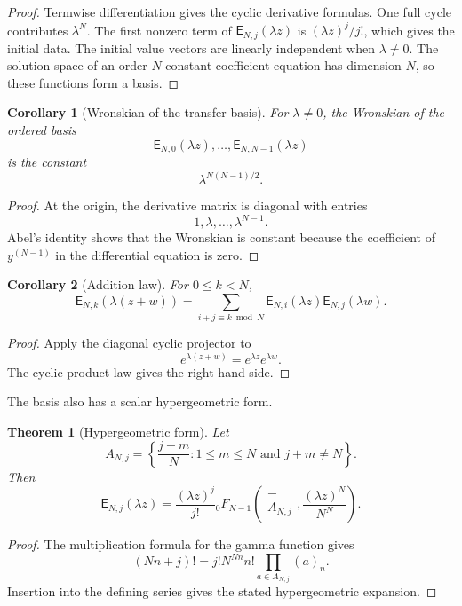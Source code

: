 \documentclass{aomart}
\newtheorem{theorem}{Theorem}[section]
\newtheorem{corollary}[corollary]{Corollary}
\theoremstyle{definition}
\theoremstyle{remark}
\newcommand{\Efun}{\mathsf E}
\begin{document}
\begin{proof}
Termwise differentiation gives the cyclic derivative formulas.  One full cycle contributes $\lambda^N$.  The first nonzero term of $\Efun_{N,j}(\lambda z)$ is $(\lambda z)^j/j!$, which gives the initial data.  The initial value vectors are linearly independent when $\lambda\ne0$.  The solution space of an order $N$ constant coefficient equation has dimension $N$, so these functions form a basis.
\end{proof}


\begin{corollary}[Wronskian of the transfer basis]\label{cor:wronskians}
For $\lambda\ne0$, the Wronskian of the ordered basis
\[
\Efun_{N,0}(\lambda z),\ldots,\Efun_{N,N-1}(\lambda z)
\]
is the constant
\[
\lambda^{N(N-1)/2}.
\]
\end{corollary}

\begin{proof}
At the origin, the derivative matrix is diagonal with entries
\[
1,\lambda,\ldots,\lambda^{N-1}.
\]
Abel's identity shows that the Wronskian is constant because the coefficient of $y^{(N-1)}$ in the differential equation is zero.
\end{proof}

\begin{corollary}[Addition law]\label{cor:exponential_addition}
For $0\leq k<N$,
\[
\Efun_{N,k}(\lambda(z+w))
=
\sum_{i+j\equiv k\bmod N}
\Efun_{N,i}(\lambda z)\Efun_{N,j}(\lambda w).
\]
\end{corollary}

\begin{proof}
Apply the diagonal cyclic projector to
\[
e^{\lambda(z+w)}=e^{\lambda z}e^{\lambda w}.
\]
The cyclic product law gives the right hand side.
\end{proof}

The basis also has a scalar hypergeometric form.

\begin{theorem}[Hypergeometric form]\label{thm:hypergeometric_form}
Let
\[
A_{N,j}
=
\left\{
\frac{j+m}{N}
\mathrel{:}
1\leq m\leq N
\text{ and }
j+m\ne N
\right\}.
\]
Then
\[
\Efun_{N,j}(\lambda z)
=
\frac{(\lambda z)^j}{j!}
{}_0F_{N-1}
\left(
\begin{matrix}-\\ A_{N,j}\end{matrix}
\mathrel{,}
\frac{(\lambda z)^N}{N^N}
\right).
\]
\end{theorem}

\begin{proof}
The multiplication formula for the gamma function gives
\[
(Nn+j)!
=
j!N^{Nn}n!
\prod_{a\in A_{N,j}}(a)_n.
\]
Insertion into the defining series gives the stated hypergeometric expansion.
\end{proof}
\end{document}
